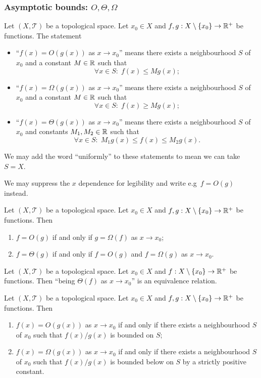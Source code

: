 \subsubsection{Asymptotic bounds: $O, \Theta, \Omega$}
\begin{definition}
Let $(X,\mathcal{T})$ be a topological space. Let $x_0 \in X$ and $f,g: X\setminus\{x_0\}\to \mathbb{R}^+$ be functions. The statement
\begin{itemize}
\item ``$f(x) = O(g(x))$ as $x\to x_0$'' means there exists a neighbourhood $S$ of $x_0$ and a constant $M\in\mathbb{R}$ such that
\[ \forall x\in S:\; f(x) \leq Mg(x); \]
\item ``$f(x) = \Omega(g(x))$ as $x\to x_0$'' means there exists a neighbourhood $S$ of $x_0$ and a constant $M\in\mathbb{R}$ such that
\[ \forall x\in S:\; f(x) \geq Mg(x); \]
\item ``$f(x) = \Theta(g(x))$ as $x\to x_0$'' means there exists a neighbourhood $S$ of $x_0$ and constants $M_1,M_2\in\mathbb{R}$ such that
\[ \forall x\in S:\; M_1g(x) \leq f(x) \leq M_2g(x). \]
\end{itemize}
We may add the word ``uniformly'' to these statements to mean we can take $S=X$.

We may suppress the $x$ dependence for legibility and write e.g\ $f = O(g)$ instead.
\end{definition}

\begin{lemma}
Let $(X,\mathcal{T})$ be a topological space. Let $x_0 \in X$ and $f,g: X\setminus\{x_0\}\to \mathbb{R}^+$ be functions. Then
\begin{enumerate}
\item $f = O(g)$ \textup{if and only if} $g = \Omega(f)$ as $x\to x_0$;
\item $f = \Theta(g)$ \textup{if and only if} $f = O(g)$ and $f = \Omega(g)$ as $x\to x_0$.
\end{enumerate}
\end{lemma}

\begin{lemma}
Let $(X,\mathcal{T})$ be a topological space. Let $x_0 \in X$ and $f: X\setminus\{x_0\}\to \mathbb{R}^+$ be functions. Then ``being $\Theta(f)$ as $x\to x_0$'' is an equivalence relation.
\end{lemma}

\begin{lemma}
Let $(X,\mathcal{T})$ be a topological space. Let $x_0 \in X$ and $f,g: X\setminus\{x_0\}\to \mathbb{R}^+$ be functions. Then
\begin{enumerate}
\item $f(x) = O(g(x))$ as $x\to x_0$ \textup{if and only if} there exists a neighbourhood $S$ of $x_0$ such that $f(x)/g(x)$ is bounded on $S$;
\item $f(x) = \Omega(g(x))$ as $x\to x_0$ \textup{if and only if} there exists a neighbourhood $S$ of $x_0$ such that $f(x)/g(x)$ is bounded below on $S$ by a strictly positive constant.
\end{enumerate}
\end{lemma}

